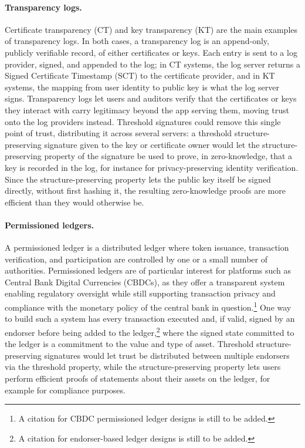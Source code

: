 \paragraph{Transparency logs.} Certificate transparency (CT) and key
transparency (KT) are the main examples of transparency logs. In both cases,
a transparency log is an append-only, publicly verifiable record, of either
certificates or keys. Each entry is sent to a log provider, signed, and
appended to the log; in CT systems, the log server returns a Signed
Certificate Timestamp (SCT) to the certificate provider, and in KT systems,
the mapping from user identity to public key is what the log server signs.
Transparency logs let users and auditors verify that the certificates or
keys they interact with carry legitimacy beyond the app serving them, moving
trust onto the log providers instead. Threshold signatures could remove this
single point of trust, distributing it across several servers: a threshold
structure-preserving signature given to the key or certificate owner would
let the structure-preserving property of the signature be used to prove, in
zero-knowledge, that a key is recorded in the log, for instance for
privacy-preserving identity verification. Since the structure-preserving
property lets the public key itself be signed directly, without first
hashing it, the resulting zero-knowledge proofs are more efficient than they
would otherwise be.

\paragraph{Permissioned ledgers.} A permissioned ledger is a distributed
ledger where token issuance, transaction verification, and participation are
controlled by one or a small number of authorities. Permissioned ledgers are
of particular interest for platforms such as Central Bank Digital Currencies
(CBDCs), as they offer a transparent system enabling regulatory oversight
while still supporting transaction privacy and compliance with the monetary
policy of the central bank in question.\footnote{A citation for CBDC
permissioned ledger designs is still to be added.} One way to build such a
system has every transaction executed and, if valid, signed by an endorser
before being added to the ledger,\footnote{A citation for endorser-based
ledger designs is still to be added.} where the signed state committed to the
ledger is a commitment to the value and type of asset. Threshold
structure-preserving signatures would let trust be distributed between
multiple endorsers via the threshold property, while the structure-preserving
property lets users perform efficient proofs of statements about their
assets on the ledger, for example for compliance purposes.

